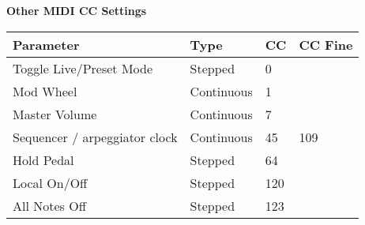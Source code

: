 \textbf{Other MIDI CC Settings}

\begin{longtable}[l]{ p{5cm}|p{2cm}|p{2cm}|p{1cm}} 
\textbf{Parameter} & \textbf{Type} & \textbf{CC} & \textbf{CC Fine} \\ \hline
Toggle Live/Preset Mode & Stepped & 0 & \\ \hline
Mod Wheel & Continuous & 1 & \\ \hline
Master Volume & Continuous & 7 & \\ \hline
Sequencer / arpeggiator clock & Continuous & 45 & 109 \\ \hline
Hold Pedal & Stepped & 64 & \\ \hline
Local On/Off & Stepped & 120 & \\ \hline
All Notes Off & Stepped & 123 & \\ \hline
\end{longtable}



\normalsize

